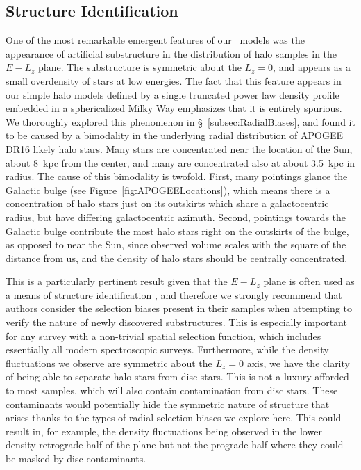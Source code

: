 \subsection{Structure Identification}

One of the most remarkable emergent features of our \survey\ models was the appearance of artificial substructure in the distribution of halo samples in the $E-L_{z}$ plane. The substructure is symmetric about the $L_{z}=0$, and appears as a small overdensity of stars at low energies. The fact that this feature appears in our simple halo models defined by a single truncated power law density profile embedded in a sphericalized Milky Way emphasizes that it is entirely spurious. We thoroughly explored this phenomenon in \S~\ref{subsec:RadialBiases}, and found it to be caused by a bimodality in the underlying radial distribution of APOGEE DR16 likely halo stars. Many stars are concentrated near the location of the Sun, about 8~kpc from the center, and many are concentrated also at about 3.5~kpc in radius. The cause of this bimodality is twofold. First, many pointings glance the Galactic bulge (see Figure~\ref{fig:APOGEELocations}), which means there is a concentration of halo stars just on its outskirts which share a galactocentric radius, but have differing galactocentric azimuth. Second, pointings towards the Galactic bulge contribute the most halo stars right on the outskirts of the bulge, as opposed to near the Sun, since observed volume scales with the square of the distance from us, and the density of halo stars should be centrally concentrated.

This is a particularly pertinent result given that the $E-L_{z}$ plane is often used as a means of structure identification \parencite[e.g.][]{helmi18,koppelman19b,horta21a}, and therefore we strongly recommend that authors consider the selection biases present in their samples when attempting to verify the nature of newly discovered substructures. This is especially important for any survey with a non-trivial spatial selection function, which includes essentially all modern spectroscopic surveys. Furthermore, while the density fluctuations we observe are symmetric about the $L_{z}=0$ axis, we have the clarity of being able to separate halo stars from disc stars. This is not a luxury afforded to most samples, which will also contain contamination from disc stars. These contaminants would potentially hide the symmetric nature of structure that arises thanks to the types of radial selection biases we explore here. This could result in, for example, the density fluctuations being observed in the lower density retrograde half of the plane but not the prograde half where they could be masked by disc contaminants.

